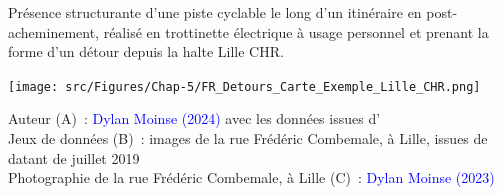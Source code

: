 \begin{refsegment}
    \begin{carte}[h!]\vspace*{4pt}
        \caption{Présence structurante d'une piste cyclable le long d'un itinéraire en post-acheminement, réalisé en trottinette électrique à usage personnel et prenant la forme d'un détour depuis la halte Lille CHR.}
        \label{fig-chap5:exemple-detours-lille-chr}
        \centerline{\texttt{[image: src/Figures/Chap-5/FR\_Detours\_Carte\_Exemple\_Lille\_CHR.png]}}
        \vspace{5pt}
        \begin{flushright}\scriptsize{
        Auteur (A)~: \textcolor{blue}{Dylan Moinse (2024)} avec les données issues d'\textcolor{blue}{\textcite{openstreetmap_openstreetmap_2023}}
        \\
        Jeux de données (B)~: images de la rue Frédéric Combemale, à Lille, issues de  datant de juillet 2019
        \\
        Photographie de la rue Frédéric Combemale, à Lille (C)~: \textcolor{blue}{Dylan Moinse (2023)}
        }\end{flushright}
    \end{carte}
    

\end{refsegment}
